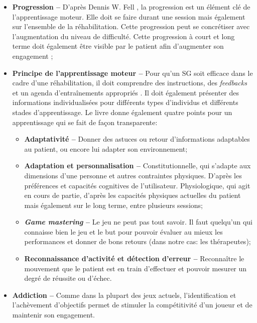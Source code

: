 \begin{itemize}
		\item \textbf{Progression --} D'après Dennis W. Fell  \cite{Fell_ProgressingTherapeuticInvervention}, la progression est un élément clé de l'apprentissage moteur. Elle doit se faire durant une session mais également sur l'ensemble de la réhabilitation. Cette progression peut se concrétiser avec l'augmentation du niveau de difficulté. Cette progression à court et long terme doit également être visible par le patient afin d'augmenter son engagement \cite{Burke_DesigningEngagingPlayableGames4Rehab};
		
		
		\item \textbf{Principe de l'apprentissage moteur --} Pour qu'un SG soit efficace dans le cadre d'une réhabilitation, il doit comprendre des instructions, des \textit{feedbacks} et un agenda d'entraînements appropriés \cite{SGVW_EducationProfDevHealthCare}. Il doit également présenter des informations individualisées pour différents types d'individus et différents stades d'apprentissage. Le livre donne également quatre points pour un apprentissage qui se fait de façon transparente:
		\begin{itemize}
			\item \textbf{Adaptativité --} Donner des astuces ou retour d'informations adaptables au patient, ou encore lui adapter son environnement;
			\item \textbf{Adaptation et personnalisation --} Constitutionnelle, qui s'adapte aux dimensions d'une personne et autres contraintes physiques. D'après les préférences et capacités cognitives de l'utilisateur. Physiologique, qui agit en cours de partie, d'après les capacités physiques actuelles du patient mais également sur le long terme, entre plusieurs sessions;
			\item \textbf{\textit{Game mastering} --} Le jeu ne peut pas tout savoir. Il faut quelqu'un qui connaisse bien le jeu et le but pour pouvoir évaluer au mieux les performances et donner de bons retours (dans notre cas: les thérapeutes);
			\item \textbf{Reconnaissance d'activité et détection d'erreur --} Reconnaître le mouvement que le patient est en train d'effectuer et pouvoir mesurer un degré de réussite ou d'échec.
		\end{itemize}
		
		\item \textbf{Addiction --} Comme dans la plupart des jeux actuels, l'identification et l'achèvement d'objectifs permet de stimuler la compétitivité d'un joueur et de maintenir son engagement.
		

\end{itemize}
